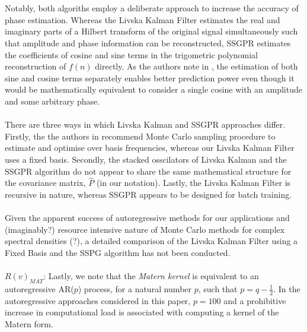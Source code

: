 \\
\\
Notably, both algoriths employ a deliberate approach to increase the accuracy of phase estimation. Whereas the Livska Kalman Filter estimates the real and imaginary parts of a Hilbert transform of the original signal simultaneously such that amplitude and phase information can be reconstructed, SSGPR estimates the coefficients of cosine and sine terms in the trigometric polynomial reconstruction of $f(n)$  directly. As the authors note in \cite{quia2010sparse}, the estimation of both sine and cosine terms separately enables better prediction power even though it would be mathematically equivalent to consider a single cosine with an amplitude and some arbitrary phase. 
\\
\\
There are three ways in which Livska Kalman and SSGPR approaches differ. Firstly, the the authors in \cite{quia2010sparse} recommend Monte Carlo sampling procedure to estimate and optimise over basis frequencies, whereas our Livska Kalman Filter uses a fixed basis. Secondly, the stacked osscilators of Livska Kalman and the SSGPR algorithm do not appear to share the same mathematical structure for the covariance matrix, $\hat{P}$ (in our notation). Lastly, the Livska Kalman Filter is recursive in nature, whereas SSGPR appears to be designed for batch training. 
\\
\\
Given the apparent success of autoregressive methods for our applications and (imaginably?) resource intensive nature of Monte Carlo methods for complex spectral densities (?), a detailed comparison of the Livska Kalman Filter using a Fixed Basis and the SSPG algorithm has not been conducted.
\\
\\
\textbf{$R(v)_{MAT}$}: Lastly, we note that the \textit{Matern kernel} is equivalent to an autoregressive AR($p$) process, for a natural number $p$, such that $p = q - \frac{1}{2}$. In the autoregressive approaches considered in this paper, $p= 100$ and a prohibitive increase in computational load is associated with computing a kernel of the Matern form.



